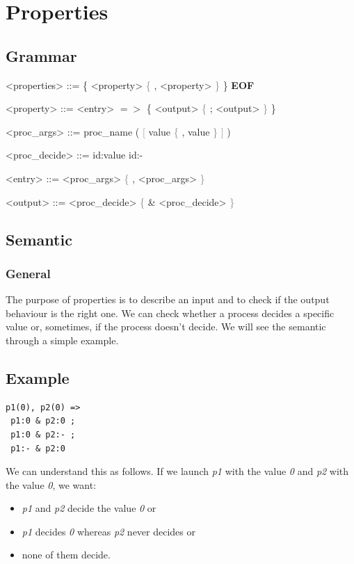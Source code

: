 \documentclass{article}
\begin{document}
\section{Properties}
\label{sec:pps}
\subsection{Grammar}
 \begin{grammar}
  <properties> ::= \{ <property> \textcolor{gray}{\{} , <property> \textcolor{gray}{\}} \} \textbf{EOF}
  
  <property> ::= <entry> $=>$ \{ <output> \textcolor{gray}{\{} ; <output> \textcolor{gray}{\}} \}
  
  <proc_args> ::=  proc\_name ( \textcolor{gray}{$[$} value \textcolor{gray}{\{} , value \textcolor{gray}{\}} \textcolor{gray}{$]$} )
  
  <proc_decide> ::= id:value
  \alt id:-
  
  <entry> ::=  <proc_args> \textcolor{gray}{\{} , <proc_args> \textcolor{gray}{\}} 
  
  <output> ::= <proc_decide> \textcolor{gray}{\{} \& <proc_decide> \textcolor{gray}{\}}
  
 \end{grammar}
 
\subsection{Semantic}
\subsubsection{General}
The purpose of properties is to describe an input and to check if the output behaviour is the right one. We can check whether a process decides a specific value or, sometimes, if the process doesn't decide. We will see the semantic through a simple example.
\subsection{Example}
\begin{lstlisting}
p1(0), p2(0) =>
 p1:0 & p2:0 ;
 p1:0 & p2:- ;
 p1:- & p2:0
\end{lstlisting}
We can understand this as follows. If we launch \textit{p1} with the value \textit{0} and \textit{p2} with the value \textit{0}, we want:
\begin{itemize}
  \item \textit{p1} and \textit{p2} decide the value \textit{0} or
  \item \textit{p1} decides \textit{0} whereas \textit{p2} never decides or
  \item none of them decide.
\end{itemize}
 
\end{document}
